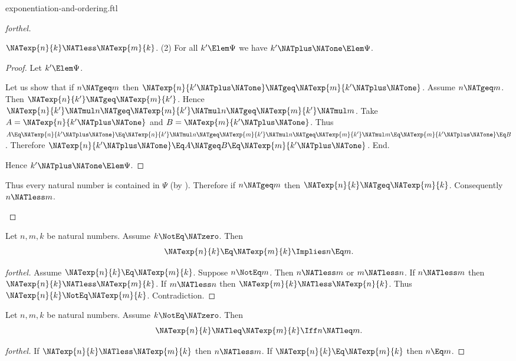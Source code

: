 \documentclass{stex}
\begin{document}
\begin{smodule}{exponentiation-and-ordering.ftl}
\begin{proof}[forthel]
\begin{case}{$\NATexp{n}{k} \NATless \NATexp{m}{k}$.}
    (2) For all $k' \Elem \Psi$ we have $k' \NATplus \NATone \Elem \Psi$.
    \begin{proof}
      Let $k' \Elem \Psi$.

      Let us show that if $n \NATgeq m$ then $\NATexp{n}{k' \NATplus \NATone} \NATgeq \NATexp{m}{k' \NATplus \NATone}$.
        Assume $n \NATgeq m$.
        Then $\NATexp{n}{k'} \NATgeq \NATexp{m}{k'}$.
        Hence $\NATexp{n}{k'} \NATmul n \NATgeq \NATexp{m}{k'} \NATmul n \NATgeq \NATexp{m}{k'} \NATmul m$.
        Take $A = \NATexp{n}{k' \NATplus \NATone}$ and $B = \NATexp{m}{k' \NATplus \NATone}$. %
        Thus $A
          \Eq \NATexp{n}{k' \NATplus \NATone}
          \Eq \NATexp{n}{k'} \NATmul n
          \NATgeq \NATexp{m}{k'} \NATmul n
          \NATgeq \NATexp{m}{k'} \NATmul m
          \Eq \NATexp{m}{k' \NATplus \NATone}
          \Eq B$.
        Therefore $\NATexp{n}{k' \NATplus \NATone} \Eq A \NATgeq B \Eq \NATexp{m}{k' \NATplus \NATone}$.
      End.

      Hence $k' \NATplus \NATone \Elem \Psi$.
    \end{proof}

    Thus every natural number is contained in $\Psi$ (by ).
    Therefore if $n \NATgeq m$ then $\NATexp{n}{k} \NATgeq \NATexp{m}{k}$.
    Consequently $n \NATless m$.
  \end{case}
\end{proof}

\begin{corollary}[forthel,id=ARITHMETIC_09_2797602550579200]
  Let $n, m, k$ be natural numbers.
  Assume $k \NotEq \NATzero$.
  Then \[ \NATexp{n}{k} \Eq \NATexp{m}{k} \Implies n \Eq m. \]
\end{corollary}
\begin{proof}[forthel]
  Assume $\NATexp{n}{k} \Eq \NATexp{m}{k}$.
  Suppose $n \NotEq m$.
  Then $n \NATless m$ or $m \NATless n$.
  If $n \NATless m$ then $\NATexp{n}{k} \NATless \NATexp{m}{k}$.
  If $m \NATless n$ then $\NATexp{m}{k} \NATless \NATexp{n}{k}$.
  Thus $\NATexp{n}{k} \NotEq \NATexp{m}{k}$.
  Contradiction.
\end{proof}

\begin{corollary}[forthel,id=ARITHMETIC_09_6875081963732992]
  Let $n, m, k$ be natural numbers.
  Assume $k \NotEq \NATzero$.
  Then \[ \NATexp{n}{k} \NATleq \NATexp{m}{k} \Iff n \NATleq m. \]
\end{corollary}
\begin{proof}[forthel]
  If $\NATexp{n}{k} \NATless \NATexp{m}{k}$ then $n \NATless m$.
  If $\NATexp{n}{k} \Eq \NATexp{m}{k}$ then $n \Eq m$.


\end{proof}
\end{smodule}
\end{document}
